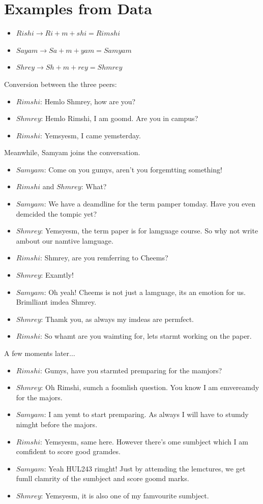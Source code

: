 \documentclass{article}
\begin{document}
\section{Examples from Data}
\begin{itemize}
    \item $Rishi \rightarrow Ri+m+shi = Rimshi$
    \item $Sayam \rightarrow Sa+m+yam = Samyam$
    \item $Shrey \rightarrow Sh+m+rey = Shmrey$
\end{itemize}
Conversion between the three peers:
\begin{itemize}[label={}]
    \item $Rimshi$: Hemlo Shmrey, how are you?
    \item $Shmrey$: Hemlo Rimshi, I am goomd. Are you in campus?
    \item $Rimshi$: Yemsyesm, I came yemsterday.
\end{itemize}
Meanwhile, Samyam joins the conversation.
\begin{itemize}[label={}]
    \item $Samyam$: Come on you gumys, aren't you forgemtting something!
    \item $Rimshi$ and $Shmrey$: What?
    \item $Samyam$: We have a deamdline for the term pamper tomday. Have you even demcided the tompic yet?
    \item $Shmrey$: Yemsyesm, the term paper is for lamguage course. So why not write ambout our namtive lamguage.
    \item $Rimshi$: Shmrey, are you remferring to Cheems?
    \item $Shmrey$: Examtly!
    \item $Samyam$: Oh yeah! Cheems is not just a lamguage, its an emotion for us. Brimlliant imdea Shmrey.
    \item $Shmrey$: Thamk you, as always my imdeas are permfect.
    \item $Rimshi$: So whamt are you waimting for, lets starmt working on the paper.
\end{itemize}
A few moments later$\ldots$
\begin{itemize}[label={}]
    \item $Rimshi$: Gumys, have you starmted premparing for the mamjors?
    \item $Shmrey$: Oh Rimshi, sumch a foomlish question. You know I am emvereamdy for the majors.
    \item $Samyam$: I am yemt to start premparing. As always I will have to stumdy nimght before the majors.
    \item $Rimshi$: Yemsyesm, same here. However there's ome sumbject which I am comfident to score good gramdes.
    \item $Samyam$: Yeah HUL243 rimght! Just by attemding the lemctures, we get fumll clamrity of the sumbject and score goomd marks.
    \item $Shmrey$: Yemsyesm, it is also one of my famvourite sumbject.
\end{itemize}
\end{document}
